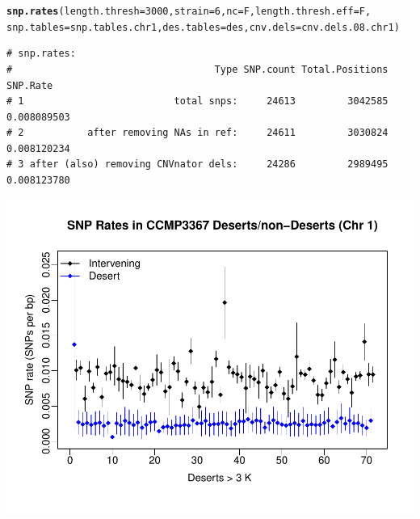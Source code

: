 \documentclass{article}\usepackage[]{graphicx}\usepackage[]{color}
\makeatletter
\def\maxwidth{ %
  \ifdim\Gin@nat@width>\linewidth
    \linewidth
  \else
    \Gin@nat@width
  \fi
}
\newcommand{\hlnum}[1]{\textcolor[rgb]{0.686,0.059,0.569}{#1}}%
\newcommand{\hlstd}[1]{\textcolor[rgb]{0.345,0.345,0.345}{#1}}%
\newcommand{\hlkwc}[1]{\textcolor[rgb]{0.333,0.667,0.333}{#1}}%
\newcommand{\hlkwd}[1]{\textcolor[rgb]{0.737,0.353,0.396}{\textbf{#1}}}%
\newenvironment{kframe}{%
 \def\at@end@of@kframe{}%
 \ifinner\ifhmode%
  \def\at@end@of@kframe{\end{minipage}}%
  \begin{minipage}{\columnwidth}%
 \fi\fi%
 \def\FrameCommand##1{\hskip\@totalleftmargin \hskip-\fboxsep
 \colorbox{shadecolor}{##1}\hskip-\fboxsep
     \hskip-\linewidth \hskip-\@totalleftmargin \hskip\columnwidth}%
 \MakeFramed {\advance\hsize-\width
   \@totalleftmargin\z@ \linewidth\hsize
   \@setminipage}}%
 {\par\unskip\endMakeFramed%
 \at@end@of@kframe}
\newenvironment{knitrout}{}{} %
\makeatother
\begin{document}
\begin{knitrout}\scriptsize
{}\color{fgcolor}\begin{kframe}
\begin{alltt}
\hlkwd{snp.rates}\hlstd{(}\hlkwc{length.thresh}\hlstd{=}\hlnum{3000}\hlstd{,} \hlkwc{strain}\hlstd{=}\hlnum{6}\hlstd{,} \hlkwc{nc}\hlstd{=F,} \hlkwc{length.thresh.eff}\hlstd{=F,}
          \hlkwc{snp.tables}\hlstd{=snp.tables.chr1,} \hlkwc{des.tables}\hlstd{=des,} \hlkwc{cnv.dels}\hlstd{=cnv.dels.08.chr1)}
\end{alltt}
\begin{verbatim}
# snp.rates:
#                                   Type SNP.count Total.Positions    SNP.Rate
# 1                          total snps:     24613         3042585 0.008089503
# 2           after removing NAs in ref:     24611         3030824 0.008120234
# 3 after (also) removing CNVnator dels:     24286         2989495 0.008123780
\end{verbatim}
\end{kframe}

{\centering \includegraphics[width=\maxwidth]{figs-knitr/it-coding-3k-o-1} 

}



\end{knitrout}
\end{document}

